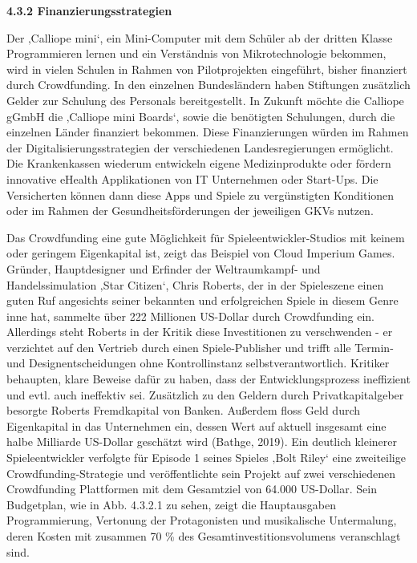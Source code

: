 \documentclass[
  a4paper,
  DIV=11,
  numbers=noendperiod,
  onecolumn,
  oneside,
  a4paper]{scrartcl}
\begin{document}
\textbf{4.3.2 Finanzierungsstrategien}

Der ‚Calliope mini`, ein Mini-Computer mit dem Schüler ab der dritten
Klasse Programmieren lernen und ein Verständnis von Mikrotechnologie
bekommen, wird in vielen Schulen in Rahmen von Pilotprojekten
eingeführt, bisher finanziert durch Crowdfunding. In den einzelnen
Bundesländern haben Stiftungen zusätzlich Gelder zur Schulung des
Personals bereitgestellt. In Zukunft möchte die Calliope gGmbH die
‚Calliope mini Boards`, sowie die benötigten Schulungen, durch die
einzelnen Länder finanziert bekommen. Diese Finanzierungen würden im
Rahmen der Digitalisierungsstrategien der verschiedenen
Landesregierungen ermöglicht. Die Krankenkassen wiederum entwickeln
eigene Medizinprodukte oder fördern innovative eHealth Applikationen von
IT Unternehmen oder Start-Ups. Die Versicherten können dann diese Apps
und Spiele zu vergünstigten Konditionen oder im Rahmen der
Gesundheitsförderungen der jeweiligen GKVs nutzen.

Das Crowdfunding eine gute Möglichkeit für Spieleentwickler-Studios mit
keinem oder geringem Eigenkapital ist, zeigt das Beispiel von Cloud
Imperium Games. Gründer, Hauptdesigner und Erfinder der Weltraumkampf-
und Handelssimulation ‚Star Citizen`, Chris Roberts, der in der
Spieleszene einen guten Ruf angesichts seiner bekannten und
erfolgreichen Spiele in diesem Genre inne hat, sammelte über 222
Millionen US-Dollar durch Crowdfunding ein. Allerdings steht Roberts in
der Kritik diese Investitionen zu verschwenden - er verzichtet auf den
Vertrieb durch einen Spiele-Publisher und trifft alle Termin- und
Designentscheidungen ohne Kontrollinstanz selbstverantwortlich. Kritiker
behaupten, klare Beweise dafür zu haben, dass der Entwicklungsprozess
ineffizient und evtl. auch ineffektiv sei. Zusätzlich zu den Geldern
durch Privatkapitalgeber besorgte Roberts Fremdkapital von Banken.
Außerdem floss Geld durch Eigenkapital in das Unternehmen ein, dessen
Wert auf aktuell insgesamt eine halbe Milliarde US-Dollar geschätzt wird
(Bathge, 2019). Ein deutlich kleinerer Spieleentwickler verfolgte für
Episode 1 seines Spieles ‚Bolt Riley` eine zweiteilige
Crowdfunding-Strategie und veröffentlichte sein Projekt auf zwei
verschiedenen Crowdfunding Plattformen mit dem Gesamtziel von 64.000
US-Dollar. Sein Budgetplan, wie in Abb. 4.3.2.1 zu sehen, zeigt die
Hauptausgaben Programmierung, Vertonung der Protagonisten und
musikalische Untermalung, deren Kosten mit zusammen 70 \% des
Gesamtinvestitionsvolumens veranschlagt sind.
\end{document}
